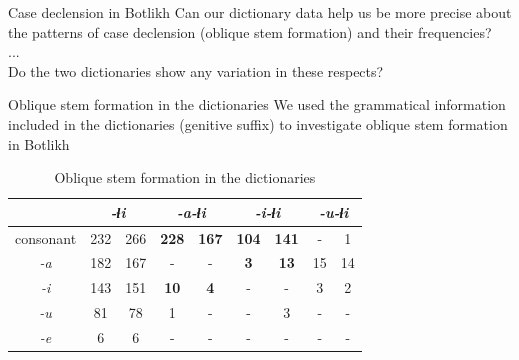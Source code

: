 \begin{frame}{Case declension in Botlikh}
\centering
Can our dictionary data help us be more precise about the patterns of case declension (oblique stem formation) and their frequencies? \\ ... \\ Do the two dictionaries show any variation in these respects?    
\end{frame}

\begin{frame}{Oblique stem formation in the dictionaries}
We used the grammatical information included in the dictionaries (genitive suffix) to investigate oblique stem formation in Botlikh
\begin{table}[]
\caption{Oblique stem formation in the dictionaries}
\centering
\begin{tabular}{|c|c|c|c|c|c|c|c|c|}
\hline
            & \multicolumn{2}{c|}{\textit{-ɬi}}                       & \multicolumn{2}{c|}{\textit{-\textbf{a}-ɬi}}                                       & \multicolumn{2}{c|}{\textit{-\textbf{i}-ɬi}}                                       & \multicolumn{2}{c|}{\textit{-\textbf{u}-ɬi}}                   \\ \hline
consonant   & {\color[HTML]{1B9045} 232} & {\color[HTML]{CE6301} 266} & {\color[HTML]{1B9045} \textbf{228}} & {\color[HTML]{CE6301} \textbf{167}} & {\color[HTML]{1B9045} \textbf{104}} & {\color[HTML]{CE6301} \textbf{141}} & {\color[HTML]{1B9045} -}  & {\color[HTML]{CE6301} 1}  \\ \hline
\textit{-a} & {\color[HTML]{1B9045} 182} & {\color[HTML]{CE6301} 167} & {\color[HTML]{1B9045} -}            & {\color[HTML]{CE6301} -}            & {\color[HTML]{1B9045} \textbf{3}}   & {\color[HTML]{CE6301} \textbf{13}}  & {\color[HTML]{1B9045} 15} & {\color[HTML]{CE6301} 14} \\ \hline
\textit{-i} & {\color[HTML]{1B9045} 143} & {\color[HTML]{CE6301} 151} & {\color[HTML]{1B9045} \textbf{10}}  & {\color[HTML]{CE6301} \textbf{4}}   & {\color[HTML]{1B9045} -}            & {\color[HTML]{CE6301} -}            & {\color[HTML]{1B9045} 3}  & {\color[HTML]{CE6301} 2}  \\ \hline
\textit{-u} & {\color[HTML]{1B9045} 81}  & {\color[HTML]{CE6301} 78}  & {\color[HTML]{1B9045} 1}            & {\color[HTML]{CE6301} -}            & {\color[HTML]{1B9045} -}            & {\color[HTML]{CE6301} 3}            & {\color[HTML]{1B9045} -}  & {\color[HTML]{CE6301} -}  \\ \hline
\textit{-e} & {\color[HTML]{1B9045} 6}   & {\color[HTML]{CE6301} 6}   & {\color[HTML]{1B9045} -}            & {\color[HTML]{CE6301} -}            & {\color[HTML]{1B9045} -}            & {\color[HTML]{CE6301} -}            & {\color[HTML]{1B9045} -}  & {\color[HTML]{CE6301} -}  \\ \hline

\end{tabular}
\end{table}
\end{frame}
